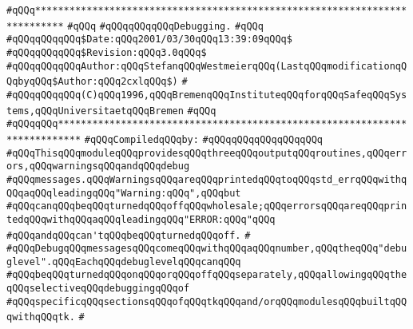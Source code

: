 \label{src/lib/tk/src/debug.api}
\verb|#qQQq***************************************************************************|\newline
\verb|#qQQq|\newline
\verb|#qQQqqQQqqQQqDebugging.|\newline
\verb|#qQQq|\newline
\verb|#qQQqqQQqqQQq$Date:qQQq2001/03/30qQQq13:39:09qQQq$|\newline
\verb|#qQQqqQQqqQQq$Revision:qQQq3.0qQQq$|\newline
\verb|#qQQqqQQqqQQqAuthor:qQQqStefanqQQqWestmeierqQQq(LastqQQqmodificationqQQqbyqQQq$Author:qQQq2cxlqQQq$)|\newline
\verb|#|\newline
\verb|#qQQqqQQqqQQq(C)qQQq1996,qQQqBremenqQQqInstituteqQQqforqQQqSafeqQQqSystems,qQQqUniversitaetqQQqBremen|\newline
\verb|#qQQq|\newline
\verb|#qQQqqQQq**************************************************************************|\newline
\newline
\verb|#qQQqCompiledqQQqby:|\newline
\verb|#qQQqqQQqqQQqqQQqqQQq|\newline
\newline
\verb|#qQQqThisqQQqmoduleqQQqprovidesqQQqthreeqQQqoutputqQQqroutines,qQQqerrors,qQQqwarningsqQQqandqQQqdebug|\newline
\verb|#qQQqmessages.qQQqWarningsqQQqareqQQqprintedqQQqtoqQQqstd_errqQQqwithqQQqaqQQqleadingqQQq"Warning:qQQq",qQQqbut|\newline
\verb|#qQQqcanqQQqbeqQQqturnedqQQqoffqQQqwholesale;qQQqerrorsqQQqareqQQqprintedqQQqwithqQQqaqQQqleadingqQQq"ERROR:qQQq"qQQq|\newline
\verb|#qQQqandqQQqcan'tqQQqbeqQQqturnedqQQqoff.|\newline
\verb|#|\newline
\verb|#qQQqDebugqQQqmessagesqQQqcomeqQQqwithqQQqaqQQqnumber,qQQqtheqQQq"debuglevel".qQQqEachqQQqdebuglevelqQQqcanqQQq|\newline
\verb|#qQQqbeqQQqturnedqQQqonqQQqorqQQqoffqQQqseparately,qQQqallowingqQQqtheqQQqselectiveqQQqdebuggingqQQqof|\newline
\verb|#qQQqspecificqQQqsectionsqQQqofqQQqtkqQQqand/orqQQqmodulesqQQqbuiltqQQqwithqQQqtk.|\newline
\verb|#|\newline
